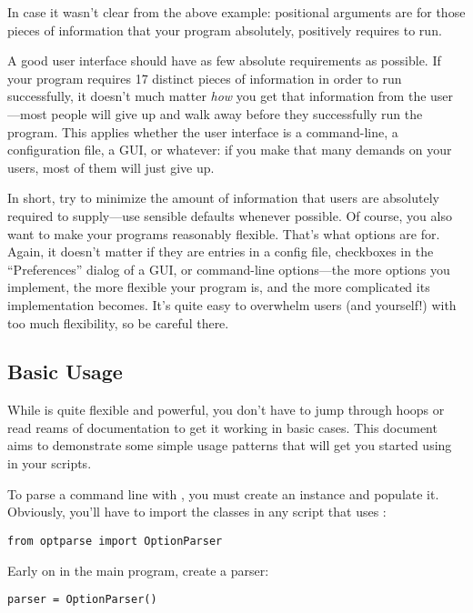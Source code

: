 In case it wasn't clear from the above example: positional arguments
are for those pieces of information that your program absolutely,
positively requires to run.

A good user interface should have as few absolute requirements as
possible.  If your program requires 17 distinct pieces of information in
order to run successfully, it doesn't much matter \emph{how} you get that
information from the user---most people will give up and walk away
before they successfully run the program.  This applies whether the user
interface is a command-line, a configuration file, a GUI, or whatever:
if you make that many demands on your users, most of them will just give
up.

In short, try to minimize the amount of information that users are
absolutely required to supply---use sensible defaults whenever
possible.  Of course, you also want to make your programs reasonably
flexible.  That's what options are for.  Again, it doesn't matter if
they are entries in a config file, checkboxes in the ``Preferences''
dialog of a GUI, or command-line options---the more options you
implement, the more flexible your program is, and the more complicated
its implementation becomes.  It's quite easy to overwhelm users (and
yourself!) with too much flexibility, so be careful there.

\subsection{Basic Usage\label{optparse-basic-usage}}

While  is quite flexible and powerful, you don't have
to jump through hoops or read reams of documentation to get it working
in basic cases.  This document aims to demonstrate some simple usage
patterns that will get you started using  in your
scripts.

To parse a command line with , you must create an
 instance and populate it.  Obviously, you'll have
to import the  classes in any script that uses
:

\begin{verbatim}
from optparse import OptionParser
\end{verbatim}

Early on in the main program, create a parser:

\begin{verbatim}
parser = OptionParser()
\end{verbatim}

